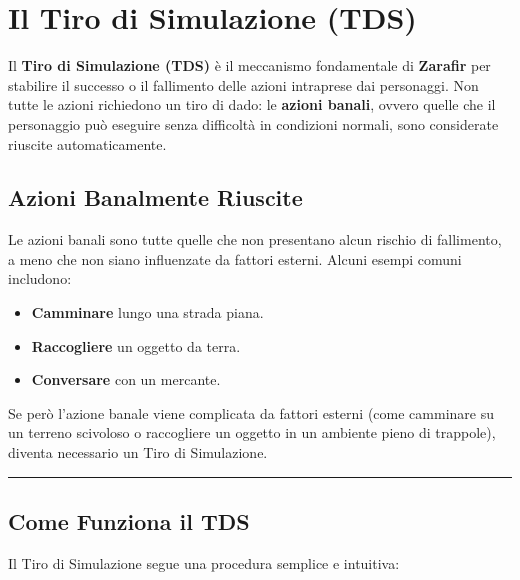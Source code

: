 \documentclass[../manuale_main.tex]{subfiles}
\begin{document}
\section{Il Tiro di Simulazione (TDS)}

Il \textbf{Tiro di Simulazione (TDS)} è il meccanismo fondamentale di \textbf{Zarafir} per stabilire il successo o il fallimento delle azioni intraprese dai personaggi. Non tutte le azioni richiedono un tiro di dado: le \textbf{azioni banali}, ovvero quelle che il personaggio può eseguire senza difficoltà in condizioni normali, sono considerate riuscite automaticamente.

\vspace{0.3cm}

\subsection{Azioni Banalmente Riuscite}
Le azioni banali sono tutte quelle che non presentano alcun rischio di fallimento, a meno che non siano influenzate da fattori esterni. Alcuni esempi comuni includono:

\begin{itemize}
    \item \textbf{Camminare} lungo una strada piana.
    \item \textbf{Raccogliere} un oggetto da terra.
    \item \textbf{Conversare} con un mercante.
\end{itemize}

Se però l'azione banale viene complicata da fattori esterni (come camminare su un terreno scivoloso o raccogliere un oggetto in un ambiente pieno di trappole), diventa necessario un Tiro di Simulazione.

\vspace{0.5cm}
\rule{\textwidth}{0.4pt}
\vspace{0.5cm}

\subsection{Come Funziona il TDS}
Il Tiro di Simulazione segue una procedura semplice e intuitiva:
\end{document}
